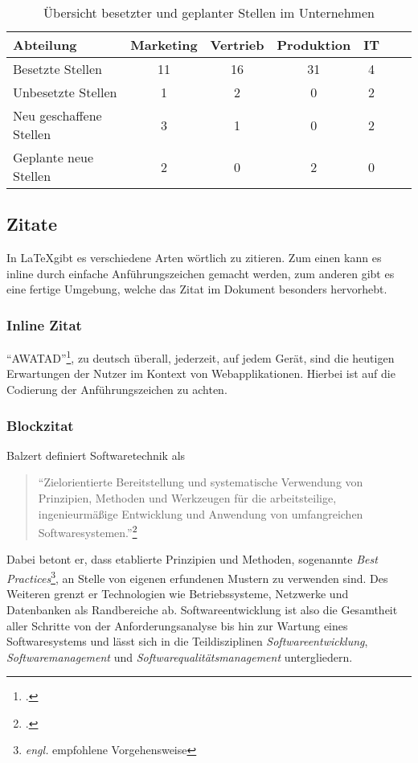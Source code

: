   \begin{table}[bh]
    \centering
    \begin{tabular}{@{}lcccccc@{}}
    \toprule
    Abteilung               & Marketing & Vertrieb & Produktion & IT \\ \midrule
    Besetzte Stellen        & 11        & 16       & 31         & 4  \\
    Unbesetzte Stellen      & 1         & 2        & 0          & 2  \\
    Neu geschaffene Stellen & 3         & 1        & 0          & 2  \\
    Geplante neue Stellen   & 2         & 0        & 2          & 0  \\ \bottomrule
    \end{tabular}
    \caption{Übersicht besetzter und geplanter Stellen im Unternehmen}
    \label{tbl_proglang}
  \end{table}

\subsection{Zitate}
  In \LaTeX gibt es verschiedene Arten wörtlich zu zitieren.
  Zum einen kann es inline durch einfache Anführungszeichen gemacht werden, 
  zum anderen gibt es eine fertige Umgebung, welche das Zitat im Dokument besonders hervorhebt.
  
  \subsubsection{Inline Zitat}
    "`\gls{AWATAD}"'\footcite[S. 2703]{timmerer2019journey}, zu deutsch überall, jederzeit, auf jedem Gerät,
    sind die heutigen Erwartungen der Nutzer im Kontext von Webapplikationen.
    Hierbei ist auf die Codierung der Anführungszeichen zu achten.
  
  \subsubsection{Blockzitat}
    Balzert definiert Softwaretechnik als
    \begin{quotation}
      "`Zielorientierte Bereitstellung und systematische Verwendung von Prinzipien, Methoden und Werkzeugen 
      für die arbeitsteilige, ingenieurmäßige Entwicklung und Anwendung von umfangreichen Softwaresystemen."'\footcite[S. 17]{balzert2009lehrbuch}    
    \end{quotation}
    Dabei betont er, dass etablierte Prinzipien und Methoden, sogenannte 
    \emph{Best Practices}\footnote{\emph{engl.} empfohlene Vorgehensweise},
    an Stelle von eigenen erfundenen Mustern zu verwenden sind.
    Des Weiteren grenzt er Technologien wie Betriebssysteme, Netzwerke und Datenbanken als Randbereiche ab. 
    Softwareentwicklung ist also die Gesamtheit aller Schritte von der Anforderungsanalyse bis hin zur Wartung eines Softwaresystems
    und lässt sich in die Teildisziplinen \emph{Softwareentwicklung}, \emph{Softwaremanagement} und \emph{Softwarequalitätsmanagement} untergliedern.

